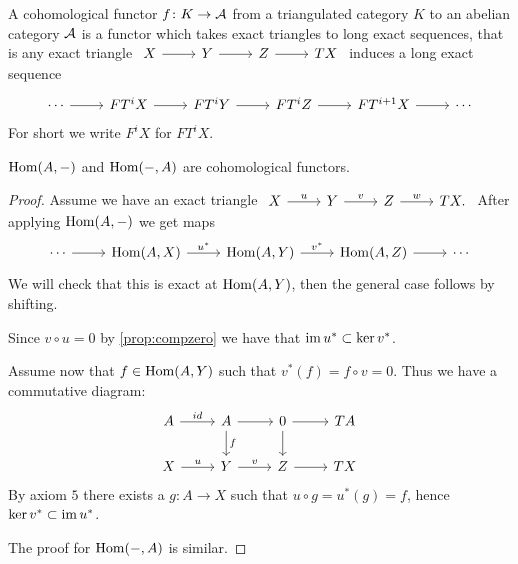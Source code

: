 \documentclass[a4paper, UKenglish]{report}
\begin{document}
\begin{definition}
    A cohomological functor $f \colon K \to \mathcal{A}$ from a triangulated category $K$ to an abelian category $\mathcal{A}$ is a functor which takes exact triangles to long exact sequences, that is any exact triangle $\begin{tikzcd} X \ar[r] & Y \ar[r] & Z \ar[r] & TX \end{tikzcd}$ induces a long exact sequence
    \[ 
        \begin{tikzcd}
            \cdots \ar[r] & FT^iX \ar[r] & FT^iY \ar[r] & FT^iZ \ar[r] & FT^{i+1}X \ar[r] & \cdots 
        \end{tikzcd}    
    \]
    For short we write $F^iX$ for $FT^iX$.
\end{definition}

\begin{lemma}
    $\operatorname{Hom}(A,-)$ and $\operatorname{Hom}(-,A)$ are cohomological functors.
\end{lemma}

\begin{proof}
    Assume we have an exact triangle $\begin{tikzcd} X \ar[r, "u"] & Y \ar[r, "v"] & Z \ar[r, "w"] & TX. \end{tikzcd}$ After applying $\operatorname{Hom}(A,-)$ we get maps
    \[ 
        \begin{tikzcd}    
            \cdots \ar[r] & \Hom(A,X) \ar[r, "u^\ast"] & \Hom(A,Y) \ar[r, "v^\ast"] & \Hom(A,Z) \ar[r] & \cdots 
        \end{tikzcd}
    \]
    We will check that this is exact at $\operatorname{Hom}(A,Y)$, then the general case follows by shifting.

    Since $v \circ u = 0$ by \cref{prop:compzero} we have that $\operatorname{im} u^\ast \subset \ker v^\ast$.

    Assume now that $f \in \operatorname{Hom}(A,Y)$ such that $v^\ast(f) = f \circ v = 0$. Thus we have a commutative diagram:
    \[
        \begin{tikzcd}
            A  \ar{r}{id} & A \ar{d}{f} \ar{r} & 0 \arrow{d} \ar{r} &  TA \\
            X \ar{r}{u} & Y \ar{r}{v} & Z \ar{r} & TX 
        \end{tikzcd} 
    \]
    By axiom $5$ there exists a $g \colon A \to X$ such that $u \circ g = u^\ast (g) = f$, hence $\ker v^\ast \subset \operatorname{im} u^\ast$.

    The proof for $\operatorname{Hom}(-,A)$ is similar.
\end{proof}

\clearpage
\printbibliography
\end{document}
